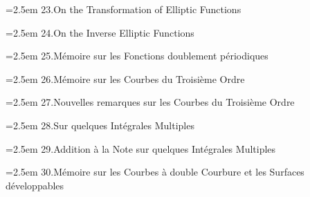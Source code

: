 \documentclass[11pt]{article}
\begin{document}
\noindent\hangindent=2.5em
23.\quad On the Transformation of Elliptic Functions\par
\hspace{1.5em}{\small Phil.\ Mag.\ t.~xxvii.\ (1845), pp.~424--427}\par

\noindent\hangindent=2.5em
24.\quad On the Inverse Elliptic Functions\par
\hspace{1.5em}{\small Camb.\ Math.\ Jour.\ t.~iv.\ (1845), pp.~257--277}\par

\noindent\hangindent=2.5em
25.\quad M\'emoire sur les Fonctions doublement p\'eriodiques\par
\hspace{1.5em}{\small Liouville, t.~x.\ (1845), pp.~385--420}\par

\noindent\hangindent=2.5em
26.\quad M\'emoire sur les Courbes du Troisi\`eme Ordre\par
\hspace{1.5em}{\small Liouville, t.~ix.\ (1844), pp.~285--293}\par

\noindent\hangindent=2.5em
27.\quad Nouvelles remarques sur les Courbes du Troisi\`eme Ordre\par
\hspace{1.5em}{\small Liouville, t.~x.\ (1845), pp.~102--109}\par

\noindent\hangindent=2.5em
28.\quad Sur quelques Int\'egrales Multiples\par
\hspace{1.5em}{\small Liouville, t.~x.\ (1845), pp.~158--168}\par

\noindent\hangindent=2.5em
29.\quad Addition \`a la Note sur quelques Int\'egrales Multiples\par
\hspace{1.5em}{\small Liouville, t.~x.\ (1845), pp.~242--244}\par

\bigskip

\noindent\hangindent=2.5em
30.\quad M\'emoire sur les Courbes \`a double Courbure et les Surfaces d\'eveloppables\par
\hspace{1.5em}{\small Liouville, t.~x.\ (1845), pp.~245--250}\par
\end{document}
